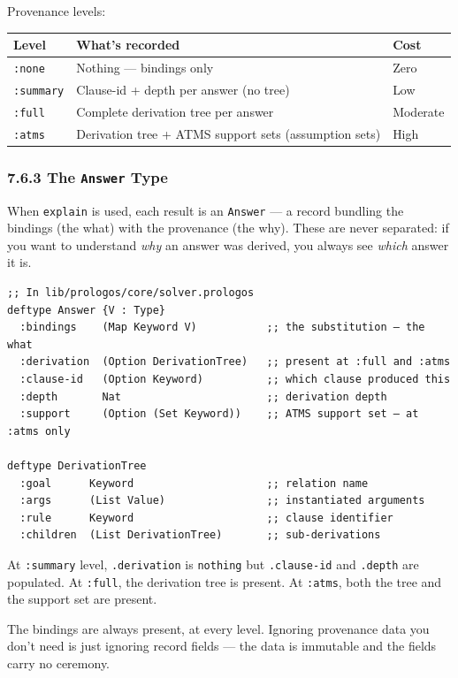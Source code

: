 \documentclass[11pt]{article}
\begin{document}
Provenance levels:

\begin{center}
\begin{tabular}{lll}
Level & What's recorded & Cost\\
\hline
\texttt{:none} & Nothing — bindings only & Zero\\
\texttt{:summary} & Clause-id + depth per answer (no tree) & Low\\
\texttt{:full} & Complete derivation tree per answer & Moderate\\
\texttt{:atms} & Derivation tree + ATMS support sets (assumption sets) & High\\
\end{tabular}
\end{center}
\subsubsection{7.6.3 The \texttt{Answer} Type}
\label{sec:org49e8332}

When \texttt{explain} is used, each result is an \texttt{Answer} — a record bundling the
bindings (the what) with the provenance (the why). These are never separated:
if you want to understand \emph{why} an answer was derived, you always see \emph{which}
answer it is.

\begin{verbatim}
;; In lib/prologos/core/solver.prologos
deftype Answer {V : Type}
  :bindings    (Map Keyword V)           ;; the substitution — the what
  :derivation  (Option DerivationTree)   ;; present at :full and :atms
  :clause-id   (Option Keyword)          ;; which clause produced this
  :depth       Nat                       ;; derivation depth
  :support     (Option (Set Keyword))    ;; ATMS support set — at :atms only

deftype DerivationTree
  :goal      Keyword                     ;; relation name
  :args      (List Value)                ;; instantiated arguments
  :rule      Keyword                     ;; clause identifier
  :children  (List DerivationTree)       ;; sub-derivations
\end{verbatim}

At \texttt{:summary} level, \texttt{.derivation} is \texttt{nothing} but \texttt{.clause-id} and
\texttt{.depth} are populated. At \texttt{:full}, the derivation tree is present. At
\texttt{:atms}, both the tree and the support set are present.

The bindings are always present, at every level. Ignoring provenance data
you don't need is just ignoring record fields — the data is immutable and
the fields carry no ceremony.
\end{document}
